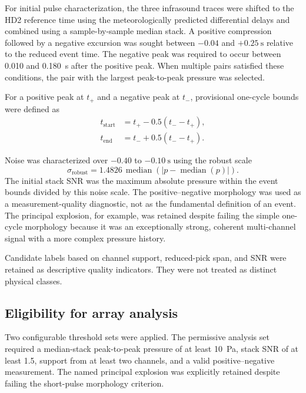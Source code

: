 \documentclass[12pt]{article}
\begin{document}
For initial pulse characterization, the three infrasound traces were shifted to
the HD2 reference time using the meteorologically predicted differential delays
and combined using a sample-by-sample median stack. A positive compression
followed by a negative excursion was sought between $-0.04$ and
$+\SI{0.25}{\second}$ relative to the reduced event time. The negative peak was
required to occur between 0.010 and \SI{0.180}{\second} after the positive peak.
When multiple pairs satisfied these conditions, the pair with the largest
peak-to-peak pressure was selected.

For a positive peak at $t_+$ and a negative peak at $t_-$, provisional one-cycle
bounds were defined as
\begin{align}
  t_{\mathrm{start}} &= t_+ - 0.5(t_- - t_+), \\
  t_{\mathrm{end}}   &= t_- + 0.5(t_- - t_+).
  \label{eq:event-bounds}
\end{align}

Noise was characterized over $-0.40$ to $-\SI{0.10}{\second}$ using the robust
scale
\begin{equation}
  \sigma_{\mathrm{robust}}
  = 1.4826\,\operatorname{median}
  \left(\left|p-\operatorname{median}(p)\right|\right).
  \label{eq:robust-noise}
\end{equation}
The initial stack SNR was the maximum absolute pressure within the event bounds
divided by this noise scale. The positive--negative morphology was used as a
measurement-quality diagnostic, not as the fundamental definition of an event.
The principal explosion, for example, was retained despite failing the simple
one-cycle morphology because it was an exceptionally strong, coherent
multi-channel signal with a more complex pressure history.

Candidate labels based on channel support, reduced-pick span, and SNR were
retained as descriptive quality indicators. They were not treated as distinct
physical classes.

\subsection{Eligibility for array analysis}

Two configurable threshold sets were applied. The permissive analysis set
required a median-stack peak-to-peak pressure of at least \SI{10}{\pascal}, stack
SNR of at least 1.5, support from at least two channels, and a valid
positive--negative measurement. The named principal explosion was explicitly
retained despite failing the short-pulse morphology criterion.
\end{document}
